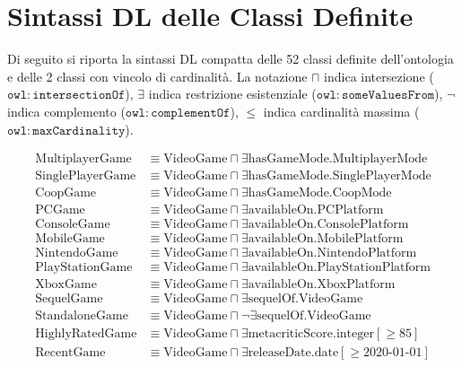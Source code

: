 \section{Sintassi DL delle Classi Definite}
\label{sec:app_dl}

Di seguito si riporta la sintassi DL compatta delle 52 classi definite
dell'ontologia e delle 2 classi con vincolo di cardinalit\`a. La notazione $\sqcap$ indica intersezione ($\mathtt{owl:intersectionOf}$),
$\exists$ indica restrizione esistenziale ($\mathtt{owl:someValuesFrom}$),
$\neg$ indica complemento ($\mathtt{owl:complementOf}$), $\leq$ indica
cardinalit\`a massima ($\mathtt{owl:maxCardinality}$).

\vspace{4pt}
\noindent
\begingroup\small\allowdisplaybreaks
\begin{align*}
\text{MultiplayerGame}      &\equiv \text{VideoGame} \sqcap \exists\text{hasGameMode.MultiplayerMode} \\
\text{SinglePlayerGame}     &\equiv \text{VideoGame} \sqcap \exists\text{hasGameMode.SinglePlayerMode} \\
\text{CoopGame}             &\equiv \text{VideoGame} \sqcap \exists\text{hasGameMode.CoopMode} \\
\text{PCGame}               &\equiv \text{VideoGame} \sqcap \exists\text{availableOn.PCPlatform} \\
\text{ConsoleGame}          &\equiv \text{VideoGame} \sqcap \exists\text{availableOn.ConsolePlatform} \\
\text{MobileGame}           &\equiv \text{VideoGame} \sqcap \exists\text{availableOn.MobilePlatform} \\
\text{NintendoGame}         &\equiv \text{VideoGame} \sqcap \exists\text{availableOn.NintendoPlatform} \\
\text{PlayStationGame}      &\equiv \text{VideoGame} \sqcap \exists\text{availableOn.PlayStationPlatform} \\
\text{XboxGame}             &\equiv \text{VideoGame} \sqcap \exists\text{availableOn.XboxPlatform} \\
\text{SequelGame}           &\equiv \text{VideoGame} \sqcap \exists\text{sequelOf.VideoGame} \\
\text{StandaloneGame}       &\equiv \text{VideoGame} \sqcap \neg\exists\text{sequelOf.VideoGame} \\
\text{HighlyRatedGame}      &\equiv \text{VideoGame} \sqcap \exists\text{metacriticScore.integer}[\geq 85] \\
\text{RecentGame}           &\equiv \text{VideoGame} \sqcap \exists\text{releaseDate.date}[\geq \text{2020-01-01}] \\

\end{align*}
